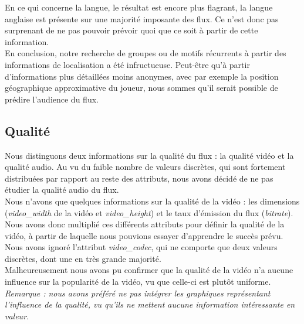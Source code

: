 \documentclass[11pt, a4paper, titlepage]{scrartcl}
\begin{document}
En ce qui concerne la langue, le résultat est encore plus flagrant, la langue
anglaise est présente sur une majorité imposante des flux. Ce n'est donc pas
surprenant de ne pas pouvoir prévoir quoi que ce soit à partir de cette
information. \\

En conclusion, notre recherche de groupes ou de motifs récurrents à partir des
informations de localisation a été infructueuse. Peut-être qu'à partir
d'informations plus détaillées moins anonymes, avec par exemple la position
géographique approximative du joueur, nous sommes qu'il serait possible de
prédire l'audience du flux.

\subsection{Qualité}

Nous distinguons deux informations sur la qualité du flux : la qualité vidéo et
la qualité audio. Au vu du faible nombre de valeurs discrètes, qui sont
fortement distribuées par rapport au reste des attributs, nous avons décidé de
ne pas étudier la qualité audio du flux. \\

Nous n'avons que quelques informations sur la qualité de la vidéo : les
dimensions (\textit{video\_width} de la vidéo et \textit{video\_height}) et le
taux d'émission du flux (\textit{bitrate}). Nous avons donc multiplié ces
différents attributs pour définir la qualité de la vidéo, à partir de laquelle
nous pouvions essayer d'apprendre le succès prévu. Nous avons ignoré l'attribut
\textit{video\_codec}, qui ne comporte que deux valeurs discrètes, dont une en
très grande majorité. \\

Malheureusement nous avons pu confirmer que la qualité de la vidéo n'a aucune
influence sur la popularité de la vidéo, vu que celle-ci est plutôt uniforme.
\\

\textit{Remarque : nous avons préféré ne pas intégrer les graphiques
    représentant l'influence de la qualité, vu qu'ils ne mettent aucune
    information intéressante en valeur.} \\
\end{document}
